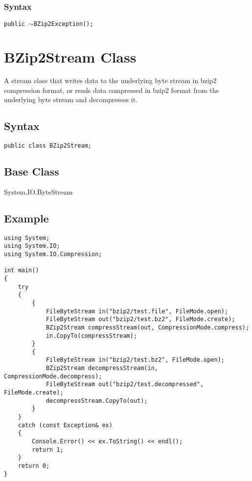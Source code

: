 \documentclass[a4paper,oneside,11.000000pt]{book}
\begin{document}
\subsubsection*{Syntax}
\texttt{public $\sim$BZip2Exception();}
\clearpage

\hypertarget{System.IO.Compression.BZip2Stream}{\section{BZip2Stream Class}}
\begin{flushleft}
A stream class that writes data to the underlying byte stream in bzip2 compression format, or reads data compressed in bzip2 format from the underlying byte stream and decompresses it.

\end{flushleft}
\subsection*{Syntax}\texttt{public class BZip2Stream;}
\subsection*{Base Class}
System.IO.ByteStream
\subsection{Example}
\lstset{frameround=fttt}\begin{lstlisting}[frame=trBL]
using System;
using System.IO;
using System.IO.Compression;

int main()
{
    try
    {
        {
            FileByteStream in("bzip2/test.file", FileMode.open);
            FileByteStream out("bzip2/test.bz2", FileMode.create);
            BZip2Stream compressStream(out, CompressionMode.compress);
            in.CopyTo(compressStream);
        }    
        {
            FileByteStream in("bzip2/test.bz2", FileMode.open);
            BZip2Stream decompressStream(in, CompressionMode.decompress);
            FileByteStream out("bzip2/test.decompressed", FileMode.create);
            decompressStream.CopyTo(out);
        }
    }
    catch (const Exception& ex)
    {
        Console.Error() << ex.ToString() << endl();
        return 1;
    }
    return 0;
}
\end{lstlisting}
\end{document}
